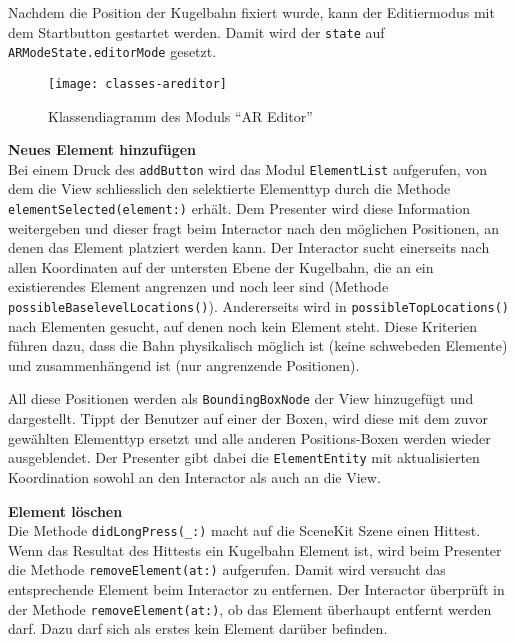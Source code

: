 Nachdem die Position der Kugelbahn fixiert wurde, kann der Editiermodus mit dem Startbutton gestartet werden.
Damit wird der \texttt{state} auf \texttt{ARModeState.editorMode} gesetzt.

\begin{figure}[htb!]
	\centering
	\texttt{[image: classes-areditor]}%
	\caption{Klassendiagramm des Moduls "`AR Editor"'}%
	\label{fig:classes-areditor}%
\end{figure}

\textbf{Neues Element hinzufügen} \\
Bei einem Druck des \texttt{addButton} wird das Modul \texttt{ElementList} aufgerufen, von dem die View schliesslich den selektierte Elementtyp durch die Methode \texttt{elementSelected(element:)} erhält.
Dem Presenter wird diese Information weitergeben und dieser fragt beim Interactor nach den möglichen Positionen, an denen das Element platziert werden kann.
Der Interactor sucht einerseits nach allen Koordinaten auf der untersten Ebene der Kugelbahn, die an ein existierendes Element angrenzen und noch leer sind (Methode \texttt{possibleBaselevelLocations()}).
Andererseits wird in \texttt{possibleTopLocations()} nach Elementen gesucht, auf denen noch kein Element steht.
Diese Kriterien führen dazu, dass die Bahn physikalisch möglich ist (keine schwebeden Elemente) und zusammenhängend ist (nur angrenzende Positionen).

All diese Positionen werden als \texttt{BoundingBoxNode} der View hinzugefügt und dargestellt.
Tippt der Benutzer auf einer der Boxen, wird diese mit dem zuvor gewählten Elementtyp ersetzt und alle anderen Positions-Boxen werden wieder ausgeblendet.
Der Presenter gibt dabei die \texttt{ElementEntity} mit aktualisierten Koordination sowohl an den Interactor als auch an die View.

\textbf{Element löschen} \\
Die Methode \texttt{didLongPress(\_:)} macht auf die SceneKit Szene einen Hittest.
Wenn das Resultat des Hittests ein Kugelbahn Element ist, wird beim Presenter die Methode \texttt{removeElement(at:)} aufgerufen.
Damit wird versucht das entsprechende Element beim Interactor zu entfernen.
Der Interactor überprüft in der Methode \texttt{removeElement(at:)}, ob das Element überhaupt entfernt werden darf.
Dazu darf sich als erstes kein Element darüber befinden.

